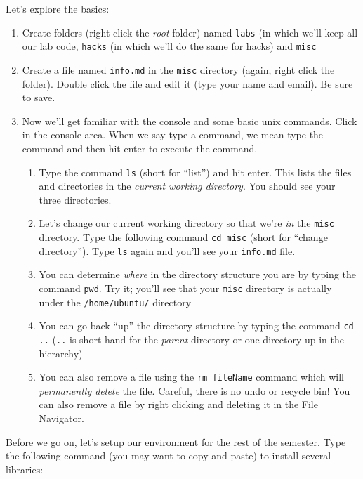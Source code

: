 \documentclass[12pt]{scrartcl}
\begin{document}
Let's explore the basics:
\begin{enumerate}
  \item Create folders (right click the \emph{root} folder) named \texttt{labs} (in which we'll keep all our lab code, \texttt{hacks} (in which we'll do the same for hacks) and \texttt{misc}
  \item Create a file named \texttt{info.md} in the \texttt{misc} directory (again, right click the folder).  Double click the file and edit it (type your name and email).  Be sure to save.
  \item Now we'll get familiar with the console and some basic unix commands.  Click
  in the console area.  When we say type a command, we mean type the command and then
  hit enter to execute the command.
  \begin{enumerate}
    \item Type the command \texttt{ls} (short for ``list'') and 
    hit enter.  This lists the files and directories in the 
    \emph{current working directory}.  You should see your three directories.
    \item Let's change our current working directory so that we're \emph{in}
    the \texttt{misc} directory.  Type the following command
    \texttt{cd misc} (short for ``change directory'').  Type \texttt{ls} again and you'll see your \texttt{info.md} file.
    \item You can determine \emph{where} in the directory structure you are
    by typing the command \texttt{pwd}.  Try it; you'll see that your
    \texttt{misc} directory is actually under the \texttt{/home/ubuntu/} directory
    \item You can go back ``up'' the directory structure by typing the command
    \texttt{cd ..} (\texttt{..} is short hand for the \emph{parent} directory or one directory up in the hierarchy)
    \item You can also remove a file using the \texttt{rm fileName} 
    command which will \emph{permanently delete} the file.  Careful, there
    is no undo or recycle bin!  You can also remove a file by right clicking
    and deleting it in the File Navigator.
  \end{enumerate}
\end{enumerate}

Before we go on, let's setup our environment for the rest of the semester.
Type the following command (you may want to copy and paste) to install 
several libraries:
\end{document}
